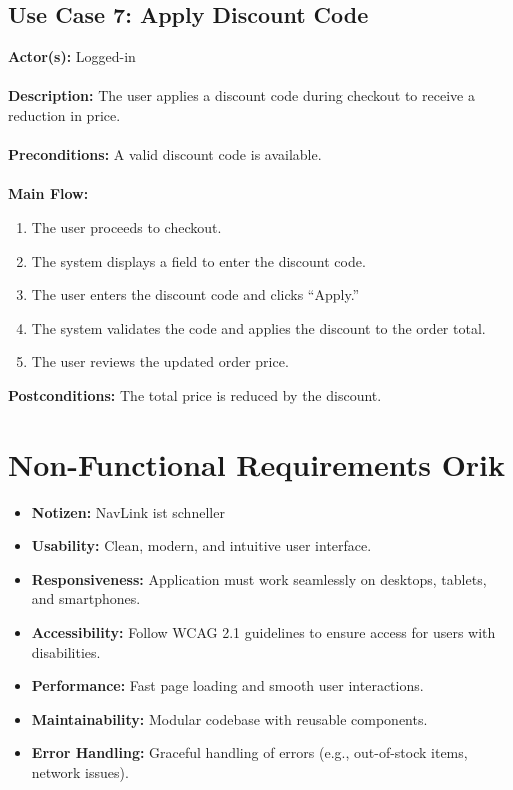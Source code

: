 \documentclass[a4paper,12pt]{article.cls}
\begin{document}
	\subsection{Use Case 7: Apply Discount Code}
	\textbf{Actor(s):} Logged-in \\ \\
	\textbf{Description:} The user applies a discount code during checkout to receive a \\ reduction in
	price. \\ \\
	\textbf{Preconditions:} A valid discount code is available. \\ \\
	\textbf{Main Flow:}
	\begin{enumerate}
  		\item The user proceeds to checkout.
  		\item The system displays a field to enter the discount code.
  		\item The user enters the discount code and clicks ``Apply.''
  		\item The system validates the code and applies the discount to the order total.
  		\item The user reviews the updated order price.
	\end{enumerate}
	\textbf{Postconditions:} The total price is reduced by the discount.


	\section{Non-Functional Requirements Orik}
	\begin{itemize}
			\item \textbf{Notizen:} NavLink ist schneller
		\item \textbf{Usability:} Clean, modern, and intuitive user interface.
		\item \textbf{Responsiveness:} Application must work seamlessly on desktops, tablets, and smartphones.
		\item \textbf{Accessibility:} Follow WCAG 2.1 guidelines to ensure access for users with disabilities.
		\item \textbf{Performance:} Fast page loading and smooth user interactions.
		\item \textbf{Maintainability:} Modular codebase with reusable components.
		\item \textbf{Error Handling:} Graceful handling of errors (e.g., out-of-stock items, network issues).
	\end{itemize}
	
\end{document}
